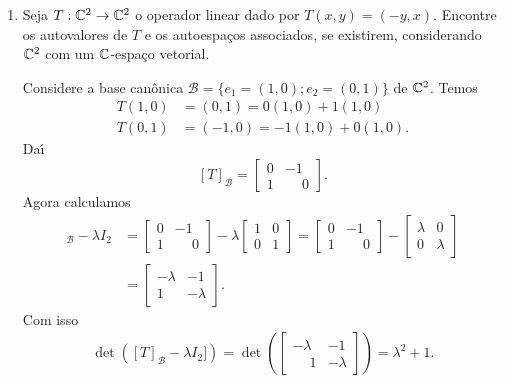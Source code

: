 \begin{exemplo}
\begin{enumerate}[label={\arabic*})]
        \item Seja $T : \mathbb{C}^2 \to \mathbb{C}^2$ o operador linear dado por $T(x,y) = (-y,x)$. Encontre os autovalores de $T$ e os autoespa\c{c}os associados, se existirem, considerando $\mathbb{C}^2$ com um $\mathbb{C}$-espa\c{c}o vetorial.
        \begin{solucao}
            Considere a base can\^onica $\mathcal{B} = \{e_1 = (1, 0); e_2 = (0, 1)\}$ de $\mathbb{C}^2$. Temos
            \begin{align}
                T(1,0) &= (0,1) = 0(1,0) + 1(1,0)\\
                T(0,1) &= (-1,0) = -1(1,0) + 0(1,0).
            \end{align}
            Da{\'\i}
            \[
                [T]_\mathcal{B} = \begin{bmatrix}0 & -1\\ 1 & \phantom{-}0\end{bmatrix}.
            \]
            Agora calculamos
            \begin{align*}
                [T]_\mathcal{B} - \lambda I_2 &= \begin{bmatrix}0 & -1\\ 1 & \phantom{-}0\end{bmatrix} - \lambda\begin{bmatrix}1 & 0\\0 & 1\end{bmatrix} = \begin{bmatrix}0 & -1\\ 1 & \phantom{-}0\end{bmatrix} - \begin{bmatrix}\lambda & 0\\0 & \lambda\end{bmatrix}\\ &= \begin{bmatrix}-\lambda & -1\\ 1 & -\lambda\end{bmatrix}.
            \end{align*}
            Com isso
            \begin{align*}
                \det([T]_\mathcal{B} - \lambda I_2]) = \det\left(\begin{bmatrix} -\lambda & -1\\\phantom{-}1 & -\lambda\end{bmatrix}\right) = \lambda^2 + 1.
            \end{align*}


\end{solucao}
\end{enumerate}
\end{exemplo}
